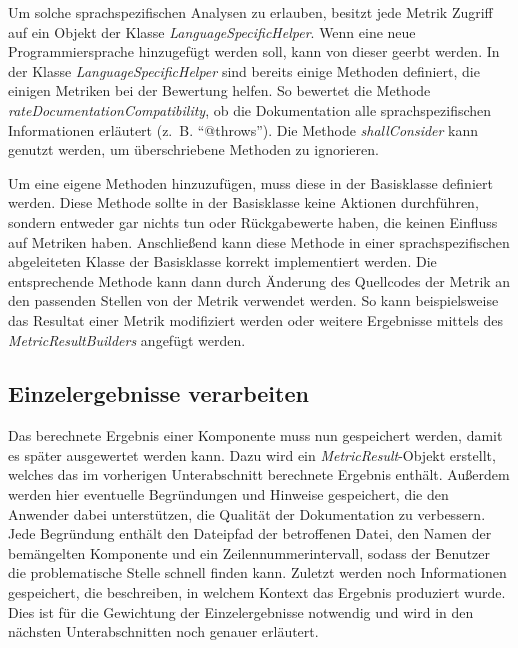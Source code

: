 Um solche sprachspezifischen Analysen zu erlauben, besitzt jede Metrik Zugriff auf ein Objekt der Klasse \textit{LanguageSpecificHelper}. Wenn eine neue Programmiersprache hinzugefügt werden soll, kann von dieser geerbt werden. In der Klasse \textit{LanguageSpecificHelper} sind bereits einige Methoden definiert, die einigen Metriken bei der Bewertung helfen. So bewertet die Methode \textit{rateDocumentationCompatibility}, ob die Dokumentation alle sprachspezifischen Informationen erläutert (z.~B. \enquote{@throws}). Die Methode \textit{shallConsider} kann genutzt werden, um überschriebene Methoden zu ignorieren. 

Um eine eigene Methoden hinzuzufügen, muss diese in der Basisklasse definiert werden. Diese Methode sollte in der Basisklasse keine Aktionen durchführen, sondern entweder gar nichts tun oder Rückgabewerte haben, die keinen Einfluss auf Metriken haben. Anschließend kann diese Methode in einer sprachspezifischen abgeleiteten Klasse der Basisklasse korrekt implementiert werden. Die entsprechende Methode kann dann durch Änderung des Quellcodes der Metrik an den passenden Stellen von der Metrik verwendet werden. So kann beispielsweise das Resultat einer Metrik modifiziert werden oder weitere Ergebnisse mittels des \textit{MetricResultBuilders} angefügt werden.

\subsection{Einzelergebnisse verarbeiten}\label{chapter:store_metric}

Das berechnete Ergebnis einer Komponente muss nun gespeichert werden, damit es später ausgewertet werden kann. Dazu wird ein \textit{MetricResult}-Objekt erstellt, welches das im vorherigen Unterabschnitt berechnete Ergebnis enthält. Außerdem werden hier eventuelle Begründungen und Hinweise gespeichert, die den Anwender dabei unterstützen, die Qualität der Dokumentation zu verbessern. Jede Begründung enthält den Dateipfad der betroffenen Datei, den Namen der bemängelten Komponente und ein Zeilennummerintervall, sodass der Benutzer die problematische Stelle schnell finden kann. Zuletzt werden noch Informationen gespeichert, die beschreiben, in welchem Kontext das Ergebnis produziert wurde. Dies ist für die Gewichtung der Einzelergebnisse notwendig und wird in den nächsten Unterabschnitten noch genauer erläutert. 

